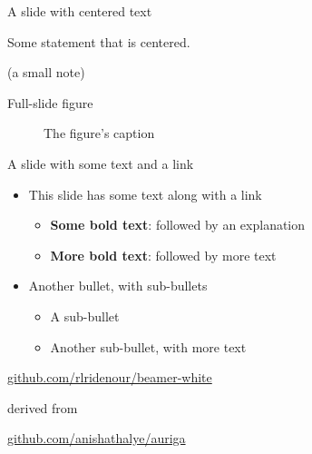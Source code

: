 \documentclass[14pt,aspectratio=169]{beamer}
\begin{document}
\begin{frame}{A slide with centered text}

  \begin{center}
    Some statement that is centered.
  \end{center}

  \vspace{2ex}
  \begin{center}
    \scriptsize (a small note)
  \end{center}

\end{frame}

\begin{frame}{Full-slide figure}

  \begin{figure}
    \centering
    \caption{The figure's caption}
  \end{figure}


\end{frame}

\begin{frame}{A slide with some text and a link}

  \begin{itemize}
    \item This slide has some text along with a link
      \begin{itemize}
        \item \textbf{Some bold text}: followed by an explanation
        \item \textbf{More bold text}: followed by more text
      \end{itemize}
    \item Another bullet, with sub-bullets
      \begin{itemize}
        \item A sub-bullet
        \item Another sub-bullet, with more text
      \end{itemize}
  \end{itemize}

  \vspace{2ex}
  \begin{center}

    \scriptsize
    \color{blue} \href{https://github.com/rlridenour/beamer-white}{github.com/rlridenour/beamer-white}

    \color{black}  derived from
    
    \color{blue} \href{https://github.com/anishathalye/auriga}{github.com/anishathalye/auriga}
  \end{center}

\end{frame}
\end{document}
